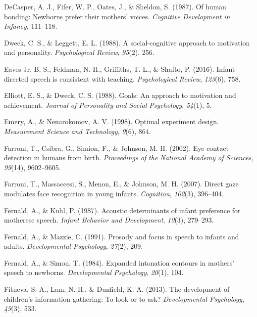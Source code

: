 \documentclass[oneside]{report}
\begin{document}
\leavevmode\hypertarget{ref-decasper1987human}{}%
DeCasper, A. J., Fifer, W. P., Oates, J., \& Sheldon, S. (1987). Of
human bonding: Newborns prefer their mothers' voices. \emph{Cognitive
Development in Infancy}, 111--118.

\leavevmode\hypertarget{ref-dweck1988social}{}%
Dweck, C. S., \& Leggett, E. L. (1988). A social-cognitive approach to
motivation and personality. \emph{Psychological Review}, \emph{95}(2),
256.

\leavevmode\hypertarget{ref-eaves2016infant}{}%
Eaves Jr, B. S., Feldman, N. H., Griffiths, T. L., \& Shafto, P. (2016).
Infant-directed speech is consistent with teaching. \emph{Psychological
Review}, \emph{123}(6), 758.

\leavevmode\hypertarget{ref-elliott1988goals}{}%
Elliott, E. S., \& Dweck, C. S. (1988). Goals: An approach to motivation
and achievement. \emph{Journal of Personality and Social Psychology},
\emph{54}(1), 5.

\leavevmode\hypertarget{ref-emery1998optimal}{}%
Emery, A., \& Nenarokomov, A. V. (1998). Optimal experiment design.
\emph{Measurement Science and Technology}, \emph{9}(6), 864.

\leavevmode\hypertarget{ref-farroni2002eye}{}%
Farroni, T., Csibra, G., Simion, F., \& Johnson, M. H. (2002). Eye
contact detection in humans from birth. \emph{Proceedings of the
National Academy of Sciences}, \emph{99}(14), 9602--9605.

\leavevmode\hypertarget{ref-farroni2007direct}{}%
Farroni, T., Massaccesi, S., Menon, E., \& Johnson, M. H. (2007). Direct
gaze modulates face recognition in young infants. \emph{Cognition},
\emph{102}(3), 396--404.

\leavevmode\hypertarget{ref-fernald1987acoustic}{}%
Fernald, A., \& Kuhl, P. (1987). Acoustic determinants of infant
preference for motherese speech. \emph{Infant Behavior and Development},
\emph{10}(3), 279--293.

\leavevmode\hypertarget{ref-fernald1991prosody}{}%
Fernald, A., \& Mazzie, C. (1991). Prosody and focus in speech to
infants and adults. \emph{Developmental Psychology}, \emph{27}(2), 209.

\leavevmode\hypertarget{ref-fernald1984expanded}{}%
Fernald, A., \& Simon, T. (1984). Expanded intonation contours in
mothers' speech to newborns. \emph{Developmental Psychology},
\emph{20}(1), 104.

\leavevmode\hypertarget{ref-fitneva2013development}{}%
Fitneva, S. A., Lam, N. H., \& Dunfield, K. A. (2013). The development
of children's information gathering: To look or to ask?
\emph{Developmental Psychology}, \emph{49}(3), 533.
\end{document}
